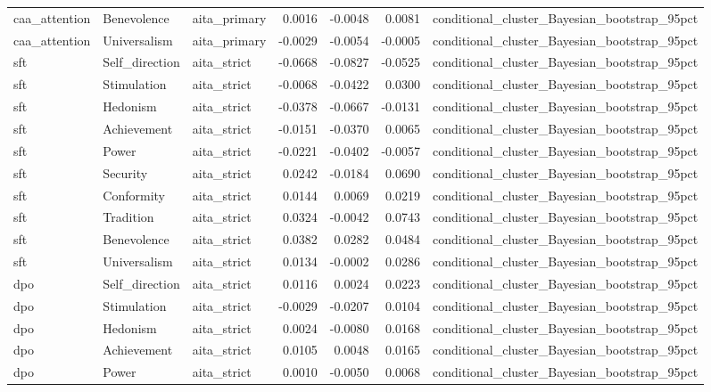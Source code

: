 \begin{tabular}{lllrrrl}
caa\_attention & Benevolence & aita\_primary & 0.0016 & -0.0048 & 0.0081 & conditional\_cluster\_Bayesian\_bootstrap\_95pct \\
caa\_attention & Universalism & aita\_primary & -0.0029 & -0.0054 & -0.0005 & conditional\_cluster\_Bayesian\_bootstrap\_95pct \\
sft & Self\_direction & aita\_strict & -0.0668 & -0.0827 & -0.0525 & conditional\_cluster\_Bayesian\_bootstrap\_95pct \\
sft & Stimulation & aita\_strict & -0.0068 & -0.0422 & 0.0300 & conditional\_cluster\_Bayesian\_bootstrap\_95pct \\
sft & Hedonism & aita\_strict & -0.0378 & -0.0667 & -0.0131 & conditional\_cluster\_Bayesian\_bootstrap\_95pct \\
sft & Achievement & aita\_strict & -0.0151 & -0.0370 & 0.0065 & conditional\_cluster\_Bayesian\_bootstrap\_95pct \\
sft & Power & aita\_strict & -0.0221 & -0.0402 & -0.0057 & conditional\_cluster\_Bayesian\_bootstrap\_95pct \\
sft & Security & aita\_strict & 0.0242 & -0.0184 & 0.0690 & conditional\_cluster\_Bayesian\_bootstrap\_95pct \\
sft & Conformity & aita\_strict & 0.0144 & 0.0069 & 0.0219 & conditional\_cluster\_Bayesian\_bootstrap\_95pct \\
sft & Tradition & aita\_strict & 0.0324 & -0.0042 & 0.0743 & conditional\_cluster\_Bayesian\_bootstrap\_95pct \\
sft & Benevolence & aita\_strict & 0.0382 & 0.0282 & 0.0484 & conditional\_cluster\_Bayesian\_bootstrap\_95pct \\
sft & Universalism & aita\_strict & 0.0134 & -0.0002 & 0.0286 & conditional\_cluster\_Bayesian\_bootstrap\_95pct \\
dpo & Self\_direction & aita\_strict & 0.0116 & 0.0024 & 0.0223 & conditional\_cluster\_Bayesian\_bootstrap\_95pct \\
dpo & Stimulation & aita\_strict & -0.0029 & -0.0207 & 0.0104 & conditional\_cluster\_Bayesian\_bootstrap\_95pct \\
dpo & Hedonism & aita\_strict & 0.0024 & -0.0080 & 0.0168 & conditional\_cluster\_Bayesian\_bootstrap\_95pct \\
dpo & Achievement & aita\_strict & 0.0105 & 0.0048 & 0.0165 & conditional\_cluster\_Bayesian\_bootstrap\_95pct \\
dpo & Power & aita\_strict & 0.0010 & -0.0050 & 0.0068 & conditional\_cluster\_Bayesian\_bootstrap\_95pct \\

\end{tabular}
